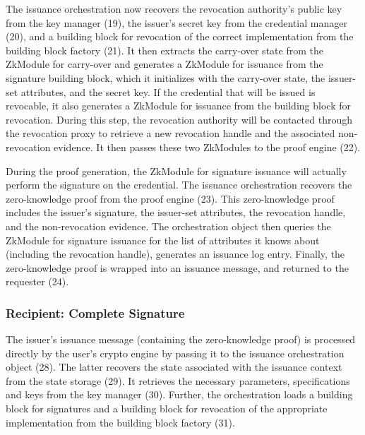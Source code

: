 The issuance orchestration now recovers the revocation authority's public key from the key manager (19), the issuer's secret key
from the credential manager (20), and a building block for revocation of the correct implementation from the building block factory (21).
It then extracts the carry-over state from the ZkModule for carry-over and  generates a ZkModule for issuance from the
signature building block, which it initializes with the carry-over state, the issuer-set attributes, and the secret key.
If the credential that will be issued is revocable, it also generates a ZkModule for issuance from the building block for revocation.
During this step, the revocation authority will be contacted through the revocation proxy to retrieve a new revocation handle 
and the associated non-revocation evidence.
It then passes these two ZkModules to the proof engine (22).


During the proof generation, the ZkModule for signature issuance will actually perform the signature on the credential.
The issuance orchestration recovers the zero-knowledge proof from the proof engine (23). 
This zero-knowledge proof includes
the issuer's signature, the issuer-set attributes, the revocation handle, and the non-revocation evidence.
The orchestration object then queries the ZkModule for signature issuance for the list of attributes it knows about (including the revocation handle),
generates an issuance log entry.
Finally, the zero-knowledge proof is wrapped into an issuance message, and returned to the requester (24).




\subsubsection{Recipient: Complete Signature}

The issuer's issuance message (containing the zero-knowledge proof) is processed directly by the user's crypto engine 
by passing it to the issuance orchestration object (28). 
The latter recovers the state associated with the issuance context from the state storage (29). 
It retrieves the necessary parameters, specifications and keys from the key manager (30).
Further, the orchestration loads a building block for signatures and a building block for revocation of the appropriate implementation from
the building block factory (31).

